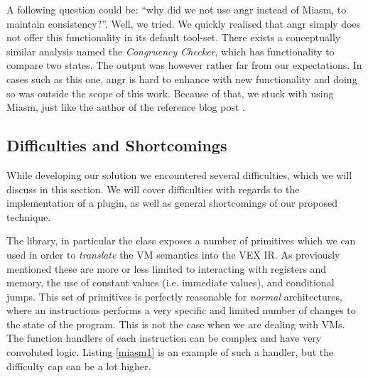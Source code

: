 A following question could be: ``why did we not use angr instead of Miasm, to maintain consistency?''. Well, we tried. We quickly realised that angr simply does not offer this functionality in its default tool-set. There exists a conceptually similar analysis named the \emph{Congruency Checker}, which has functionality to compare two states. The output was however rather far from our expectations. In cases such as this one, angr is hard to enhance with new functionality and doing so was outside the scope of this work. Because of that, we stuck with using Miasm, just like the author of the reference blog post \cite{zeusvm_miasm}.

\subsection{Difficulties and Shortcomings}
\label{sec:shortcomings}

While developing our solution we encountered several difficulties, which we will discuss in this section. We will cover difficulties with regards to the implementation of a plugin, as well as general shortcomings of our proposed technique.

The  library, in particular the  class exposes a number of primitives which we can used in order to \emph{translate} the \gls{VM} semantics into the VEX \gls{IR}. As previously mentioned these are more or less limited to interacting with registers and memory, the use of constant values (i.e. immediate values), and conditional jumps. This set of primitives is perfectly reasonable for \emph{normal} architectures, where an instructions performs a very specific and limited number of changes to the state of the program. This is not the case when we are dealing with \glspl{VM}. The function handlers of each instruction can be complex and have very convoluted logic. Listing \ref{miasm1} is an example of such a handler, but the difficulty cap can be a lot higher.


